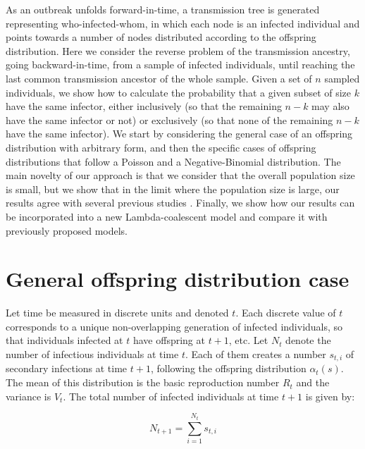 \documentclass{article}
\begin{document}
As an outbreak unfolds forward-in-time, a transmission tree is generated representing who-infected-whom,
in which each node is an infected individual and points towards a number of nodes distributed according
to the offspring distribution. Here we consider the reverse problem of the transmission ancestry, going backward-in-time, from a sample of infected individuals, until reaching the last common 
transmission ancestor of the whole sample. Given a set of $n$ sampled individuals,
we show how to calculate the probability that a given subset of size $k$ have the same infector,
either inclusively (so that the remaining $n-k$ may also have the same infector or not)
or exclusively (so that none of the remaining $n-k$ have the same infector). We start
by considering the general case of an offspring distribution with arbitrary form, 
and then the specific cases of 
offspring distributions that follow a Poisson and a Negative-Binomial distribution.
The main novelty of our approach is that we consider that the overall population size is small,
but we show that in the limit where the population size is large, our results agree with several previous
studies \citep{Volz2012a,koelleRatesCoalescenceCommon2012,Fraser2017}.
Finally, we show how our results can be incorporated into a new Lambda-coalescent model 
\citep{pitmanCoalescentsMultipleCollisions1999,sagitovGeneralCoalescentAsynchronous1999,
donnellyParticleRepresentationsMeasureValued1999} and compare it with previously
proposed models.

\section{General offspring distribution case}

Let time be measured in discrete units and denoted $t$. Each discrete value of $t$ corresponds to a unique non-overlapping 
generation of infected individuals, so that individuals infected at $t$ have offspring at $t+1$, etc. 
Let $N_t$ denote the number of infectious individuals at time $t$. Each of them creates a number $s_{t,i}$ of secondary infections at time $t+1$, following the offspring distribution $\alpha_t(s)$. The mean of this distribution is the basic reproduction number $R_t$ and the variance is $V_t$. The total number of infected individuals at time $t+1$ is given by:

\begin{equation}
N_{t+1}=\sum_{i=1}^{N_t} s_{t,i}
\label{eq:summation}
\end{equation}
\end{document}

